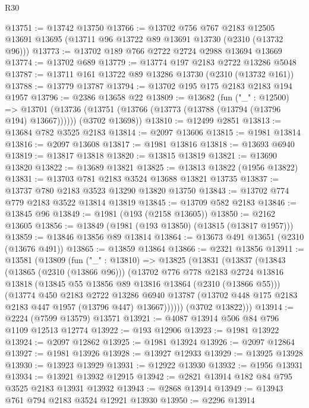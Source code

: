 \begin{lexlean}{R30}
\begin{coremodule}
@13751 := @13742 @13750
@13766 := @13702
    @756
    @767
    @2183
    @12505
    @13691
    @13695
    (@13711 @96 @13722 @89 @13691 @13730 (@2310 (@13732 @96)))
@13773 := @13702 @189 @766 @2722 @2724 @2988 @13694 @13669
@13774 := @13702 @689
@13779 := @13774 @197 @2183 @2722 @13286 @5048
@13787 := @13711 @161 @13722 @89 @13286 @13730 (@2310 (@13732 @161))
@13788 := @13779 @13787
@13794 := @13702 @195 @175 @2183 @2183 @194 @1957
@13796 := @2386 @13658 @22
@13809 := @13682
    (fun ("_" : @12500) =>
    @13701
      (@13736 (@13751 (@13766 (@13773 (@13788 (@13794 (@13796 @194) @13667))))))
      (@3702 @13698))
@13810 := @12499 @2851
@13813 := @13684 @782 @3525 @2183
@13814 := @2097 @13606
@13815 := @1981 @13814
@13816 := @2097 @13608
@13817 := @1981 @13816
@13818 := @13693 @6940
@13819 := @13817 @13818
@13820 := @13815 @13819
@13821 := @13690 @13820
@13822 := @13689 @13821
@13825 := @13813 @13822 (@1956 @13822)
@13831 := @13703 @781 @2183 @3524 @13688 @13821 @13735
@13837 := @13737 @780 @2183 @3523 @13290 @13820 @13750
@13843 := @13702 @774 @779 @2183 @3522 @13814 @13819
@13845 := @13709 @582 @2183
@13846 := @13845 @96
@13849 := @1981 (@193 (@2158 @13605))
@13850 := @2162 @13605
@13856 := @13849 (@1981 (@193 @13850) (@13815 (@13817 @1957)))
@13859 := @13846 @13856 @89 @13814
@13864 := @13673 @491 @13651 (@2310 (@13676 @491))
@13865 := @13859 @13864
@13866 := @2321 @13856
@13911 := @13581
    (@13809
      (fun ("_" : @13810) =>
      @13825
        (@13831
          (@13837
            (@13843
              (@13865 (@2310 (@13866 @96)))
              (@13702
                @776
                @778
                @2183
                @2724
                @13816
                @13818
                (@13845 @55 @13856 @89 @13816 @13864 (@2310 (@13866 @55)))
                (@13774
                  @450
                  @2183
                  @2722
                  @13286
                  @6940
                  @13787
                  (@13702 @448 @175 @2183 @2183 @447 @1957 (@13796 @447) @13667))))))
        (@3702 @13822)))
@13914 := @2224 (@7599 @13579) @13571
@13921 := @4087 @13914 @506 @84 @796 @1109 @12513 @12774
@13922 := @193 @12906
@13923 := @1981 @13922
@13924 := @2097 @12862
@13925 := @1981 @13924
@13926 := @2097 @12864
@13927 := @1981 @13926
@13928 := @13927 @12933
@13929 := @13925 @13928
@13930 := @13923 @13929
@13931 := @12922 @13930
@13932 := @1956 @13931
@13934 := @13921 @13932 @12915
@13942 := @2821 @13914 @182 @84 @795 @3525 @2183 @13931 @13932
@13943 := @2868 @13914
@13949 := @13943 @761 @794 @2183 @3524 @12921 @13930
@13950 := @2296 @13914

\end{coremodule}
\end{lexlean}
